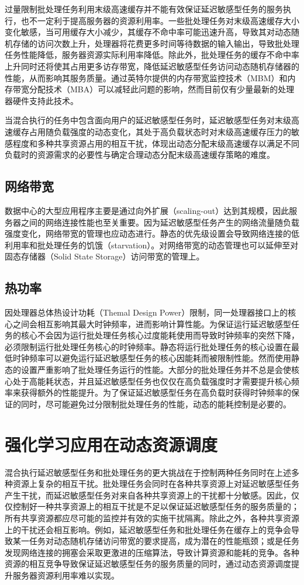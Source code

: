 过量限制批处理任务利用末级高速缓存并不能有效保证延迟敏感型任务的服务执行，也不一定利于提高服务器的资源利用率。一些批处理任务对末级高速缓存大小变化敏感，当可用缓存大小减少，其缓存不命中率可能迅速升高，导致其对动态随机存储的访问次数上升，处理器将花费更多时间等待数据的输入输出，导致批处理任务性能降低，服务器资源实际利用率降低。除此外，批处理任务的缓存不命中率上升同时还将使其占用更多访存带宽，降低延迟敏感型任务访问动态随机存储器的性能，从而影响其服务质量。通过英特尔提供的内存带宽监控技术（MBM）和内存带宽分配技术（MBA）可以减轻此问题的影响，然而目前仅有少量最新的处理器硬件支持此技术。

当混合执行的任务中包含面向用户的延迟敏感型任务时，延迟敏感型任务对末级高速缓存占用随负载强度的动态变化，其处于高负载状态时对末级高速缓存压力的敏感程度和多种共享资源占用的相互干扰，体现出动态分配末级高速缓存以满足不同负载时的资源需求的必要性与确定合理动态分配末级高速缓存策略的难度。


\subsection{网络带宽}
数据中心的大型应用程序主要是通过向外扩展（scaling-out）达到其规模，因此服务器之间的网络连接性能也至关重要。因为延迟敏感型任务产生的网络流量随负载强度变化，网络带宽的管理也应动态进行。静态的优先级设置会导致网络连接的低利用率和批处理任务的饥饿（starvation）\cite{pattara2002starvation}。对网络带宽的动态管理也可以延伸至对固态存储器（Solid State Storage）访问带宽的管理上\cite{seong2010hydra}。

\subsection{热功率}
因处理器总体热设计功耗（Themal Design Power）限制，同一处理器接口上的核心之间会相互影响其最大时钟频率，进而影响计算性能。为保证运行延迟敏感型任务的核心不会因为运行批处理任务核心过度能耗使用而导致时钟频率的突然下降，必须限制运行批处理任务核心的时钟频率。静态将运行批处理任务的核心设置在最低时钟频率可以避免运行延迟敏感型任务的核心因能耗而被限制性能。然而使用静态的设置严重影响了批处理任务运行的性能。大部分的批处理任务并不总是会使核心处于高能耗状态，并且延迟敏感型任务也仅仅在高负载强度时才需要提升核心频率来获得额外的性能提升。为了保证延迟敏感型任务在高负载时获得时钟频率的保证的同时，尽可能避免过分限制批处理任务的性能，动态的能耗控制是必要的。

\section{强化学习应用在动态资源调度}
混合执行延迟敏感型任务和批处理任务的更大挑战在于控制两种任务同时在上述多种资源上复杂的相互干扰。批处理任务会同时在各种共享资源上对延迟敏感型任务产生干扰，而延迟敏感型任务对来自各种共享资源上的干扰都十分敏感。因此，仅仅控制好一种共享资源上的相互干扰是不足以保证延迟敏感型任务的服务质量的；所有共享资源都应尽可能的监控并有效的实施干扰隔离。除此之外，各种共享资源上的干扰还会相互影响。例如，延迟敏感型任务和批处理任务在缓存上的竞争会导致某一任务对动态随机存储访问带宽的要求提高，成为潜在的性能瓶颈；或是任务发现网络连接的拥塞会采取更激进的压缩算法，导致计算资源和能耗的竞争。各种资源的相互竞争导致保证延迟敏感型任务的服务质量的同时，通过动态资源调度提升服务器资源利用率难以实现。


